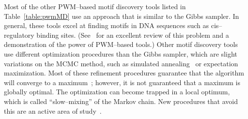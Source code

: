 Most of the other PWM--based motif discovery tools listed in
Table~\ref{table:pwmMD} use an approach that is similar to the Gibbs
sampler.  In general, these tools excel at finding motifs in DNA
sequences such as cis--regulatory binding sites.
(See~\citet{tompa2005assessing} for an excellent review of this
problem and a demonstration of the power of PWM--based tools.) Other
motif discovery tools use different optimization procedures than the
Gibbs sampler, which are slight variations on the MCMC method, such
as simulated annealing~\cite{kirkpatrick1983optimization} or
expectation maximization. Most of these refinement procedures
guarantee that the algorithm will converge to a
maximum~\cite{gelman1992inference}; however, it is not guaranteed
that a maximum is globally optimal. The optimization can become
trapped in a local optimum, which is called ``slow--mixing'' of the
Markov chain.  New procedures that avoid this are an active area of
study~\cite{liu2001monte}.
